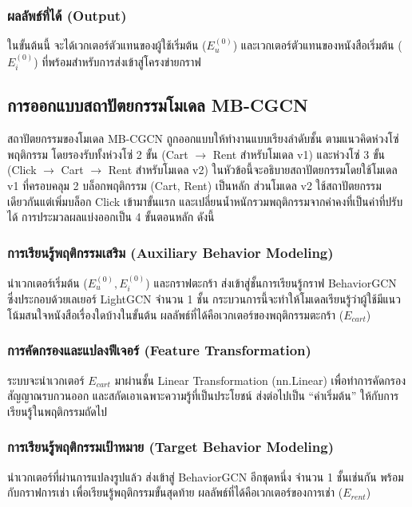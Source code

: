 \subsubsection{ผลลัพธ์ที่ได้ (Output)}
ในขั้นต้นนี้ จะได้เวกเตอร์ตัวแทนของผู้ใช้เริ่มต้น ($E_u^{(0)}$) และเวกเตอร์ตัวแทนของหนังสือเริ่มต้น ($E_i^{(0)}$) ที่พร้อมสำหรับการส่งเข้าสู่โครงข่ายกราฟ

\subsection{การออกแบบสถาปัตยกรรมโมเดล MB-CGCN}

สถาปัตยกรรมของโมเดล MB-CGCN ถูกออกแบบให้ทำงานแบบเรียงลำดับชั้น ตามแนวคิดห่วงโซ่พฤติกรรม โดยรองรับทั้งห่วงโซ่ 2 ขั้น (Cart $\rightarrow$ Rent สำหรับโมเดล v1) และห่วงโซ่ 3 ขั้น (Click $\rightarrow$ Cart $\rightarrow$ Rent สำหรับโมเดล v2) ในหัวข้อนี้จะอธิบายสถาปัตยกรรมโดยใช้โมเดล v1 ที่ครอบคลุม 2 บล็อกพฤติกรรม (Cart, Rent) เป็นหลัก ส่วนโมเดล v2 ใช้สถาปัตยกรรมเดียวกันแต่เพิ่มบล็อก Click เข้ามาขั้นแรก และเปลี่ยนน้ำหนักรวมพฤติกรรมจากค่าคงที่เป็นค่าที่ปรับได้ การประมวลผลแบ่งออกเป็น 4 ขั้นตอนหลัก ดังนี้

\subsubsection{การเรียนรู้พฤติกรรมเสริม (Auxiliary Behavior Modeling)}
นำเวกเตอร์เริ่มต้น ($E_u^{(0)}, E_i^{(0)}$) และกราฟตะกร้า ส่งเข้าสู่ชั้นการเรียนรู้กราฟ BehaviorGCN ซึ่งประกอบด้วยเลเยอร์ LightGCN จำนวน 1 ชั้น กระบวนการนี้จะทำให้โมเดลเรียนรู้ว่าผู้ใช้มีแนวโน้มสนใจหนังสือเรื่องใดบ้างในขั้นต้น ผลลัพธ์ที่ได้คือเวกเตอร์ของพฤติกรรมตะกร้า ($E_{cart}$)

\subsubsection{การคัดกรองและแปลงฟีเจอร์ (Feature Transformation)}
ระบบจะนำเวกเตอร์ $E_{cart}$ มาผ่านชั้น Linear Transformation (nn.Linear) เพื่อทำการคัดกรองสัญญาณรบกวนออก และสกัดเอาเฉพาะความรู้ที่เป็นประโยชน์ ส่งต่อไปเป็น ``ค่าเริ่มต้น'' ให้กับการเรียนรู้ในพฤติกรรมถัดไป

\subsubsection{การเรียนรู้พฤติกรรมเป้าหมาย (Target Behavior Modeling)}
นำเวกเตอร์ที่ผ่านการแปลงรูปแล้ว ส่งเข้าสู่ BehaviorGCN อีกชุดหนึ่ง จำนวน 1 ชั้นเช่นกัน พร้อมกับกราฟการเช่า เพื่อเรียนรู้พฤติกรรมขั้นสุดท้าย ผลลัพธ์ที่ได้คือเวกเตอร์ของการเช่า ($E_{rent}$)

